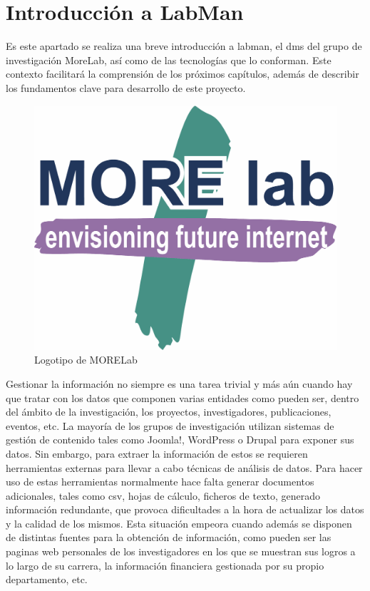 \section{Introducción a LabMan}

Es este apartado se realiza una breve introducción a \acrfull{labman}, el \acrlong{dms} del grupo de investigación MoreLab, así como de las tecnologías que lo conforman. Este contexto facilitará la comprensión de los próximos capítulos, además de describir los fundamentos clave para desarrollo de este proyecto.

\begin{figure}[!htp]
	\centering
	\includegraphics[scale=0.15]{fig/morelab-logo}
	\caption{Logotipo de MORELab}
\end{figure}

Gestionar la información no siempre es una tarea trivial y más aún cuando hay que tratar con los datos que componen varias entidades como pueden ser, dentro del ámbito de la investigación, los proyectos, investigadores, publicaciones, eventos, etc. La mayoría de los grupos de investigación utilizan sistemas de gestión de contenido tales como Joomla!\cite{joomla}, WordPress\cite{wordpress} o Drupal\cite{drupal} para exponer sus datos. Sin embargo, para extraer la información de estos  se requieren herramientas externas para llevar a cabo técnicas de análisis de datos. 
Para hacer uso de estas herramientas normalmente hace falta generar documentos adicionales, tales como \acrshort{csv}, hojas de cálculo, ficheros de texto, generado información redundante, que provoca dificultades a la hora de actualizar los datos y la calidad de los mismos. Esta situación empeora cuando además se disponen de distintas fuentes para la obtención de información, como pueden ser las paginas web personales de los investigadores en los que se muestran sus logros a lo largo de su carrera, la información financiera gestionada por su propio departamento, etc.


